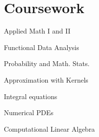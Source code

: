 \documentclass[]{deedy-resume-openfont}
\begin{document}
\begin{minipage}[t]{0.42\textwidth}
\section{Coursework}
\vspace{\topsep} %
\begin{tightemize}
\item Applied Math I and II
\item Functional Data Analysis
\item Probability and Math. Stats.
\item Approximation with Kernels
\item Integral equations
\item Numerical PDEs
\item Computational Linear Algebra
\end{tightemize}


%
%

\end{minipage} 
\hfill
\end{document}
